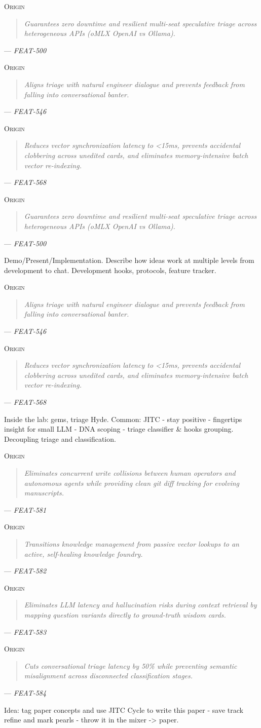 \documentclass[11pt]{article}
\newcommand{\originquote}[1]{%
  \begin{quote}
  \textit{#1}
  \end{quote}
}
\newcommand{\originmark}{%
  \textsc{Origin}\enspace
}
\begin{document}
\noindent\originmark
\originquote{Guarantees zero downtime and resilient multi-seat speculative triage across heterogeneous APIs (oMLX OpenAI vs Ollama).}
\hfill --- \textit{FEAT-500}

\noindent\originmark
\originquote{Aligns triage with natural engineer dialogue and prevents feedback from falling into conversational banter.}
\hfill --- \textit{FEAT-546}

\noindent\originmark
\originquote{Reduces vector synchronization latency to <15ms, prevents accidental clobbering across unedited cards, and eliminates memory-intensive batch vector re-indexing.}
\hfill --- \textit{FEAT-568}

\noindent\originmark
\originquote{Guarantees zero downtime and resilient multi-seat speculative triage across heterogeneous APIs (oMLX OpenAI vs Ollama).}
\hfill --- \textit{FEAT-500}

Demo/Present/Implementation. Describe how ideas work at multiple levels from development to chat. Development hooks, protocols, feature tracker. \cite{FEAT500} \cite{FEAT526}

\noindent\originmark
\originquote{Aligns triage with natural engineer dialogue and prevents feedback from falling into conversational banter.}
\hfill --- \textit{FEAT-546}

\noindent\originmark
\originquote{Reduces vector synchronization latency to <15ms, prevents accidental clobbering across unedited cards, and eliminates memory-intensive batch vector re-indexing.}
\hfill --- \textit{FEAT-568}

Inside the lab: gems, triage Hyde. Common: JITC - stay positive - fingertips insight for small LLM - DNA scoping - triage classifier \& hooks grouping. Decoupling triage and classification. \cite{FEAT546} \cite{FEAT568}

\noindent\originmark
\originquote{Eliminates concurrent write collisions between human operators and autonomous agents while providing clean git diff tracking for evolving manuscripts.}
\hfill --- \textit{FEAT-581}

\noindent\originmark
\originquote{Transitions knowledge management from passive vector lookups to an active, self-healing knowledge foundry.}
\hfill --- \textit{FEAT-582}

\noindent\originmark
\originquote{Eliminates LLM latency and hallucination risks during context retrieval by mapping question variants directly to ground-truth wisdom cards.}
\hfill --- \textit{FEAT-583}

\noindent\originmark
\originquote{Cuts conversational triage latency by 50\% while preventing semantic misalignment across disconnected classification stages.}
\hfill --- \textit{FEAT-584}

Idea: tag paper concepts and use JITC Cycle to write this paper - save track refine and mark pearls - throw it in the mixer -> paper. \cite{FEAT581} \cite{FEAT582} \cite{FEAT583} \cite{FEAT584}




\end{document}
